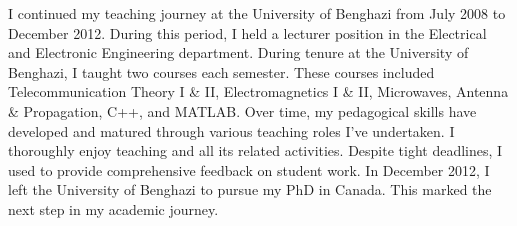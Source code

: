 \documentclass[11pt]{article}
\begin{document}

I continued my teaching journey at the University of Benghazi from July 2008 to December 2012. During this period, I held a lecturer position in the Electrical and Electronic Engineering department. During tenure at the University of Benghazi, I taught two courses each semester. These courses included Telecommunication Theory I \& II, Electromagnetics I \& II, Microwaves, Antenna \& Propagation, C++, and MATLAB.
Over time, my pedagogical skills have developed and matured through various teaching roles I've undertaken. I thoroughly enjoy teaching and all its related activities. Despite tight deadlines, I used to provide comprehensive feedback on student work. 
In December 2012, I left the University of Benghazi to pursue my PhD in Canada. %
This marked the next step in my academic journey.








\end{document}
